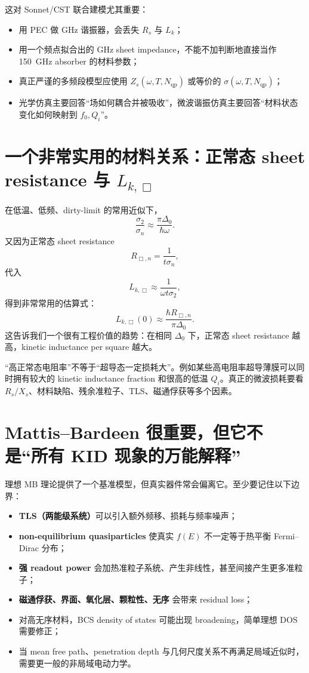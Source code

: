 \documentclass[11pt,a4paper,openany]{ctexrep}
\newcommand{\qp}{\mathrm{qp}}
\begin{document}
\begin{projectbox}
这对 Sonnet/CST 联合建模尤其重要：
\begin{itemize}
  \item 用 PEC 做 GHz 谐振器，会丢失 $R_s$ 与 $L_k$；
  \item 用一个频点拟合出的 GHz sheet impedance，不能不加判断地直接当作 \SI{150}{GHz} absorber 的材料参数；
  \item 真正严谨的多频段模型应使用 $Z_s(\omega,T,N_{\qp})$ 或等价的 $\sigma(\omega,T,N_{\qp})$；
  \item 光学仿真主要回答“场如何耦合并被吸收”，微波谐振仿真主要回答“材料状态变化如何映射到 $f_0,Q_i$”。
\end{itemize}
\end{projectbox}

\section{一个非常实用的材料关系：正常态 sheet resistance 与 $L_{k,\Box}$}

在低温、低频、dirty-limit 的常用近似下，
\[
\frac{\sigma_2}{\sigma_n}\approx\frac{\pi\Delta_0}{\hbar\omega}.
\]
又因为正常态 sheet resistance
\[
R_{\Box,n}=\frac{1}{t\sigma_n},
\]
代入
\[
L_{k,\Box}\approx\frac{1}{\omega t\sigma_2},
\]
得到非常常用的估算式：
\[
\boxed{
L_{k,\Box}(0)
\approx
\frac{\hbar R_{\Box,n}}{\pi\Delta_0}.
}
\]
这告诉我们一个很有工程价值的趋势：在相同 $\Delta_0$ 下，正常态 sheet resistance 越高，kinetic inductance per square 越大。

\begin{mistakebox}
“高正常态电阻率”不等于“超导态一定损耗大”。例如某些高电阻率超导薄膜可以同时拥有较大的 kinetic inductance fraction 和很高的低温 $Q_i$。真正的微波损耗要看 $R_s/X_s$、材料缺陷、残余准粒子、TLS、磁通俘获等多个因素。
\end{mistakebox}

\section{Mattis--Bardeen 很重要，但它不是“所有 KID 现象的万能解释”}

理想 MB 理论提供了一个基准模型，但真实器件常会偏离它。至少要记住以下边界：
\begin{itemize}
  \item \textbf{TLS（两能级系统）}可以引入额外频移、损耗与频率噪声；
  \item \textbf{non-equilibrium quasiparticles} 使真实 $f(E)$ 不一定等于热平衡 Fermi--Dirac 分布；
  \item \textbf{强 readout power} 会加热准粒子系统、产生非线性，甚至间接产生更多准粒子；
  \item \textbf{磁通俘获、界面、氧化层、颗粒性、无序} 会带来 residual loss；
  \item 对高无序材料，BCS density of states 可能出现 broadening，简单理想 DOS 需要修正；
  \item 当 mean free path、penetration depth 与几何尺度关系不再满足局域近似时，需要更一般的非局域电动力学。
\end{itemize}
\end{document}
